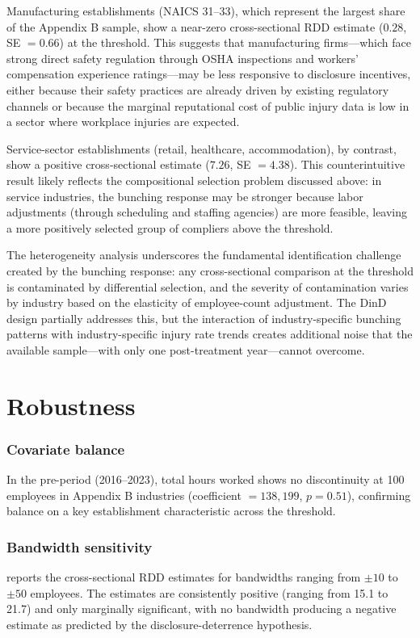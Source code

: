 \documentclass[12pt]{article}
\begin{document}
Manufacturing establishments (NAICS 31--33), which represent the largest share of the Appendix B sample, show a near-zero cross-sectional RDD estimate ($0.28$, SE $= 0.66$) at the threshold. This suggests that manufacturing firms---which face strong direct safety regulation through OSHA inspections and workers' compensation experience ratings---may be less responsive to disclosure incentives, either because their safety practices are already driven by existing regulatory channels or because the marginal reputational cost of public injury data is low in a sector where workplace injuries are expected.

Service-sector establishments (retail, healthcare, accommodation), by contrast, show a positive cross-sectional estimate ($7.26$, SE $= 4.38$). This counterintuitive result likely reflects the compositional selection problem discussed above: in service industries, the bunching response may be stronger because labor adjustments (through scheduling and staffing agencies) are more feasible, leaving a more positively selected group of compliers above the threshold.

The heterogeneity analysis underscores the fundamental identification challenge created by the bunching response: any cross-sectional comparison at the threshold is contaminated by differential selection, and the severity of contamination varies by industry based on the elasticity of employee-count adjustment. The DinD design partially addresses this, but the interaction of industry-specific bunching patterns with industry-specific injury rate trends creates additional noise that the available sample---with only one post-treatment year---cannot overcome.


\section{Robustness}\label{sec:robustness}

\subsubsection*{Covariate balance} In the pre-period (2016--2023), total hours worked shows no discontinuity at 100 employees in Appendix B industries (coefficient $= 138,199$, $p = 0.51$), confirming balance on a key establishment characteristic across the threshold.

\subsubsection*{Bandwidth sensitivity}  reports the cross-sectional RDD estimates for bandwidths ranging from $\pm 10$ to $\pm 50$ employees. The estimates are consistently positive (ranging from 15.1 to 21.7) and only marginally significant, with no bandwidth producing a negative estimate as predicted by the disclosure-deterrence hypothesis.
\end{document}
